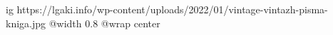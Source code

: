  
 
 
 
 

\ifcmt
  ig https://lgaki.info/wp-content/uploads/2022/01/vintage-vintazh-pisma-kniga.jpg
  @width 0.8
	@wrap center
\fi
